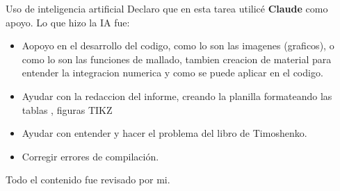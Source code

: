 



\begin{desarrollo}{Uso de inteligencia artificial}
Declaro que en esta tarea utilic\'e \textbf{Claude} como apoyo. Lo que hizo la IA fue:
\begin{itemize}[itemsep=2pt]
  \item Aopoyo en el desarrollo del codigo, como lo son las imagenes (graficos), o como lo son las funciones de mallado, tambien creacion de material para entender la integracion numerica y como se puede aplicar  en el codigo.
  \item Ayudar con la redaccion del informe, creando la planilla formateando las tablas , figuras TIKZ
  \item Ayudar con entender y hacer el problema del libro de Timoshenko.
  \item Corregir errores de compilaci\'on.
\end{itemize}
Todo el contenido fue revisado por mi.
\end{desarrollo}



